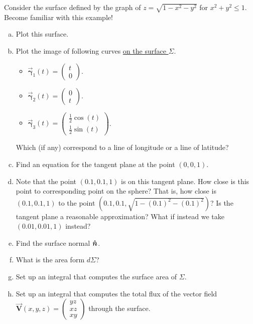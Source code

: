 \documentclass[12pt]{article} %
\newcommand{\vecfieldV}{\boldsymbol{\vec{V}}}
\newcommand{\curvegamma}{\boldsymbol{\vec{\gamma}}}
\begin{document}
\begin{problem}
    Consider the surface defined by the graph of $z = \sqrt{1-x^2-y^2}$ for $x^2+y^2\leq 1$. Become familiar with this example!
    \begin{enumerate}[(a)]
        \item Plot this surface.
        \item Plot the image of following curves \underline{on the surface $\Sigma$}. 
        \begin{itemize}
            \item $\curvegamma_1(t) = \begin{pmatrix} t\\ 0 \end{pmatrix}$.
            \item $\curvegamma_2(t) = \begin{pmatrix} 0 \\ t \end{pmatrix}$. 
            \item $\curvegamma_3(t) = \begin{pmatrix} \frac{1}{2} \cos(t) \\ \frac{1}{2} \sin(t) \end{pmatrix}$.
        \end{itemize}
        Which (if any) correspond to a line of longitude or a line of latitude?
        \item Find an equation for the tangent plane at the point $(0,0,1)$.
        \item Note that the point $(0.1,0.1,1)$ is on this tangent plane.  How close is this point to corresponding point on the sphere? That is, how close is $(0.1,0.1,1)$ to the point $(0.1,0.1,\sqrt{1-(0.1)^2-(0.1)^2})$? Is the tangent plane a reasonable approximation? What if instead we take $(0.01,0.01,1)$ instead?
        \item Find the surface normal $\boldsymbol{\hat{n}}$.
        \item What is the area form $d\Sigma$?
        \item Set up an integral that computes the surface area of $\Sigma$.
        \item Set up an integral that computes the total flux of the vector field $\vecfieldV(x,y,z) = \begin{pmatrix} yz \\ xz \\ xy \end{pmatrix}$ through the surface.
    \end{enumerate}
\end{problem}
\end{document}
